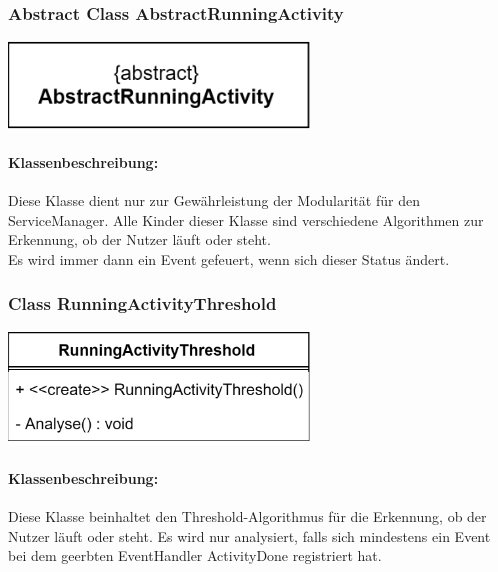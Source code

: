 \documentclass[a4paper,12pt]{article}
\begin{document}
	
	
	\begin{minipage}[b]{0.65\textwidth}
		\subsubsection{Abstract Class AbstractRunningActivity}
		\end{minipage}
		\begin{minipage}[c]{0.5\textwidth}
			\includegraphics[width=0.6\textwidth]{bilder/EMKlassen/AbstractRunningActivityClass.png}
		\end{minipage}
	\paragraph{Klassenbeschreibung:}
	Diese Klasse dient nur zur Gewährleistung der Modularität für den ServiceManager. Alle Kinder dieser Klasse sind verschiedene Algorithmen zur Erkennung, ob der Nutzer läuft oder steht.\\ Es wird immer dann ein Event gefeuert, wenn sich dieser Status ändert.\\
	\newline
	\begin{minipage}[b]{0.6\textwidth}
		\subsubsection{Class RunningActivityThreshold}
		\end{minipage}
		\begin{minipage}[c]{0.5\textwidth}
			\includegraphics[width=0.6\textwidth]{bilder/EMKlassen/RunningActivityThresholdClass.png}
		\end{minipage}
		
	\paragraph{Klassenbeschreibung:}
	Diese Klasse beinhaltet den Threshold-Algorithmus für die Erkennung, ob der Nutzer läuft oder steht. Es wird nur analysiert, falls sich mindestens ein Event bei dem geerbten EventHandler ActivityDone registriert hat.
\end{document}
